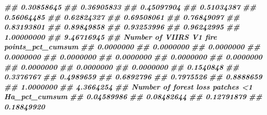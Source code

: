 \documentclass[10pt,landscape,a3paper]{article}
\newenvironment{Shaded}{\begin{snugshade}}{\end{snugshade}}
\newcommand{\DocumentationTok}[1]{\textcolor[rgb]{0.56,0.35,0.01}{\textbf{\textit{#1}}}}
\begin{document}
\begin{Shaded}
\begin{Highlighting}[]
\DocumentationTok{\#\#                                 0.30858645}
\DocumentationTok{\#\#                                 0.36905833}
\DocumentationTok{\#\#                                 0.45097904}
\DocumentationTok{\#\#                                 0.51034387}
\DocumentationTok{\#\#                                 0.56064485}
\DocumentationTok{\#\#                                 0.62824327}
\DocumentationTok{\#\#                                 0.69508061}
\DocumentationTok{\#\#                                 0.76849097}
\DocumentationTok{\#\#                                 0.83193801}
\DocumentationTok{\#\#                                 0.89849858}
\DocumentationTok{\#\#                                 0.93253996}
\DocumentationTok{\#\#                                 0.96242995}
\DocumentationTok{\#\#                                 1.00000000}
\DocumentationTok{\#\#                                 9.46716945}
\DocumentationTok{\#\#  Number of VIIRS V1 fire points\_pct\_cumsum}
\DocumentationTok{\#\#                                  0.0000000}
\DocumentationTok{\#\#                                  0.0000000}
\DocumentationTok{\#\#                                  0.0000000}
\DocumentationTok{\#\#                                  0.0000000}
\DocumentationTok{\#\#                                  0.0000000}
\DocumentationTok{\#\#                                  0.0000000}
\DocumentationTok{\#\#                                  0.0000000}
\DocumentationTok{\#\#                                  0.0000000}
\DocumentationTok{\#\#                                  0.0000000}
\DocumentationTok{\#\#                                  0.0000000}
\DocumentationTok{\#\#                                  0.0000000}
\DocumentationTok{\#\#                                  0.1540848}
\DocumentationTok{\#\#                                  0.3376767}
\DocumentationTok{\#\#                                  0.4989659}
\DocumentationTok{\#\#                                  0.6892796}
\DocumentationTok{\#\#                                  0.7975526}
\DocumentationTok{\#\#                                  0.8888659}
\DocumentationTok{\#\#                                  1.0000000}
\DocumentationTok{\#\#                                  4.3664254}
\DocumentationTok{\#\#  Number of forest loss patches \textless{}1 Ha\_pct\_cumsum}
\DocumentationTok{\#\#                                      0.04589986}
\DocumentationTok{\#\#                                      0.08482644}
\DocumentationTok{\#\#                                      0.12791879}
\DocumentationTok{\#\#                                      0.18849920}

\end{Highlighting}
\end{Shaded}
\end{document}
